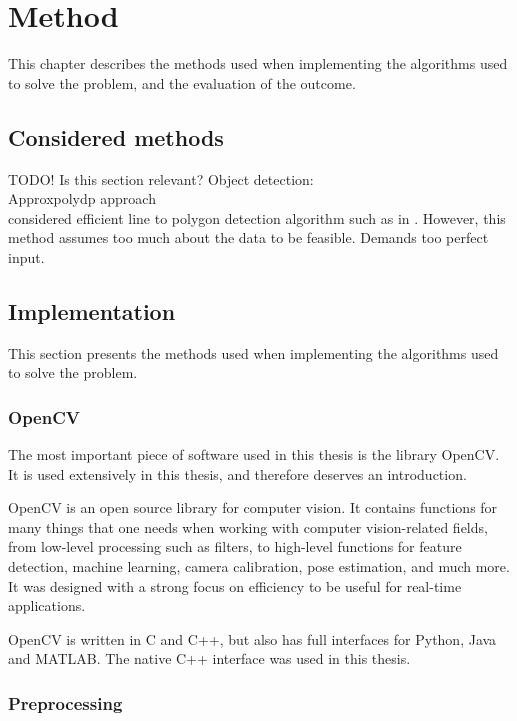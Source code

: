 \chapter{Method}

This chapter describes the methods used when implementing the algorithms used to solve the problem, and the evaluation of the outcome.

\section{Considered methods}
TODO! Is this section relevant? %
Object detection: \\
Approxpolydp approach\\
considered efficient line to polygon detection algorithm such as in \cite{joaquim2003polygon}.
However, this method assumes too much about the data to be feasible. Demands too perfect input.

\section{Implementation} \label{method:implementation}
This section presents the methods used when implementing the algorithms used to solve the problem. %

\subsection{OpenCV} %
The most important piece of software used in this thesis is the library OpenCV.
It is used extensively in this thesis, and therefore deserves an introduction.

OpenCV is an open source library for computer vision. %
It contains functions for many things that one needs when working with computer vision-related fields, from low-level processing such as filters, to high-level functions for feature detection, machine learning, camera calibration, pose estimation, and much more.
It was designed with a strong focus on efficiency to be useful for real-time applications. \cite{bradski2008learning}

OpenCV is written in C and C++, but also has full interfaces for Python, Java and MATLAB\cite{wiki:OpenCV}.
The native C++ interface was used in this thesis. %

\subsection{Preprocessing}

